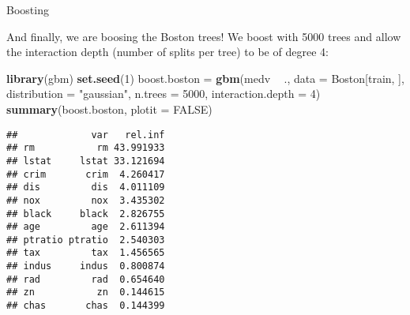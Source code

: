 \documentclass[10pt,ignorenonframetext,]{beamer}
\newenvironment{Shaded}{\begin{snugshade}}{\end{snugshade}}
\newcommand{\DataTypeTok}[1]{\textcolor[rgb]{0.13,0.29,0.53}{#1}}
\newcommand{\DecValTok}[1]{\textcolor[rgb]{0.00,0.00,0.81}{#1}}
\newcommand{\KeywordTok}[1]{\textcolor[rgb]{0.13,0.29,0.53}{\textbf{#1}}}
\newcommand{\NormalTok}[1]{#1}
\newcommand{\OperatorTok}[1]{\textcolor[rgb]{0.81,0.36,0.00}{\textbf{#1}}}
\newcommand{\OtherTok}[1]{\textcolor[rgb]{0.56,0.35,0.01}{#1}}
\newcommand{\StringTok}[1]{\textcolor[rgb]{0.31,0.60,0.02}{#1}}
\begin{document}
\begin{frame}[fragile]

\begin{block}{Boosting}

\vspace{2mm}

And finally, we are boosing the Boston trees! We boost with 5000 trees
and allow the interaction depth (number of splits per tree) to be of
degree 4:

\vspace{2mm}

\scriptsize

\begin{Shaded}
\begin{Highlighting}[]
\KeywordTok{library}\NormalTok{(gbm)}
\KeywordTok{set.seed}\NormalTok{(}\DecValTok{1}\NormalTok{)}
\NormalTok{boost.boston =}\StringTok{ }\KeywordTok{gbm}\NormalTok{(medv }\OperatorTok{~}\StringTok{ }\NormalTok{., }\DataTypeTok{data =}\NormalTok{ Boston[train, ], }\DataTypeTok{distribution =} \StringTok{"gaussian"}\NormalTok{, }
    \DataTypeTok{n.trees =} \DecValTok{5000}\NormalTok{, }\DataTypeTok{interaction.depth =} \DecValTok{4}\NormalTok{)}
\KeywordTok{summary}\NormalTok{(boost.boston, }\DataTypeTok{plotit =} \OtherTok{FALSE}\NormalTok{)}
\end{Highlighting}
\end{Shaded}

\begin{verbatim}
##             var   rel.inf
## rm           rm 43.991933
## lstat     lstat 33.121694
## crim       crim  4.260417
## dis         dis  4.011109
## nox         nox  3.435302
## black     black  2.826755
## age         age  2.611394
## ptratio ptratio  2.540303
## tax         tax  1.456565
## indus     indus  0.800874
## rad         rad  0.654640
## zn           zn  0.144615
## chas       chas  0.144399
\end{verbatim}

\end{block}

\end{frame}
\end{document}

